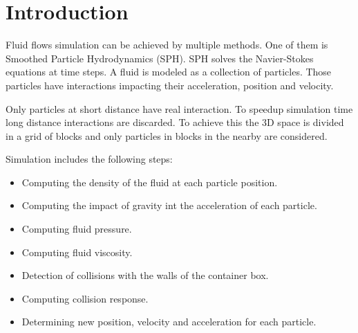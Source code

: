 \section{Introduction}

Fluid flows simulation can be achieved by multiple methods. One of them is
Smoothed Particle Hydrodynamics (SPH). SPH solves the Navier-Stokes equations
at time steps. A fluid is modeled as a collection of particles. Those
particles have interactions impacting their acceleration, position and velocity.

Only particles at short distance have real interaction. To speedup simulation
time long distance interactions are discarded. To achieve this the 3D space
is divided in a grid of blocks and only particles in blocks in the nearby are
considered.

Simulation includes the following steps:
\begin{itemize}
\item Computing the density of the fluid at each particle position.
\item Computing the impact of gravity int the acceleration of each particle.
\item Computing fluid pressure.
\item Computing fluid viscosity.
\item Detection of collisions with the walls of the container box.
\item Computing collision response.
\item Determining new position, velocity and acceleration for each particle.
\end{itemize}
